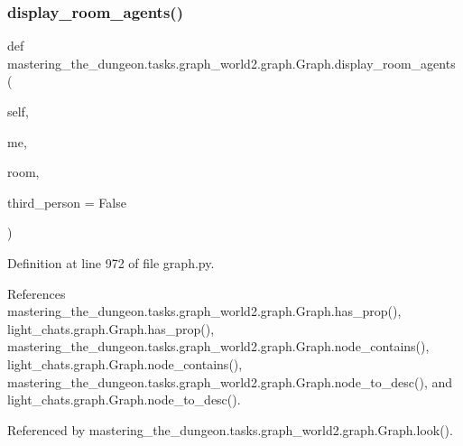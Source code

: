 \subsubsection{\texorpdfstring{display\+\_\+room\+\_\+agents()}{display\_room\_agents()}}
{\footnotesize\ttfamily def mastering\+\_\+the\+\_\+dungeon.\+tasks.\+graph\+\_\+world2.\+graph.\+Graph.\+display\+\_\+room\+\_\+agents (\begin{DoxyParamCaption}\item[{}]{self,  }\item[{}]{me,  }\item[{}]{room,  }\item[{}]{third\+\_\+person = {\ttfamily False} }\end{DoxyParamCaption})}



Definition at line 972 of file graph.\+py.



References mastering\+\_\+the\+\_\+dungeon.\+tasks.\+graph\+\_\+world2.\+graph.\+Graph.\+has\+\_\+prop(), light\+\_\+chats.\+graph.\+Graph.\+has\+\_\+prop(), mastering\+\_\+the\+\_\+dungeon.\+tasks.\+graph\+\_\+world2.\+graph.\+Graph.\+node\+\_\+contains(), light\+\_\+chats.\+graph.\+Graph.\+node\+\_\+contains(), mastering\+\_\+the\+\_\+dungeon.\+tasks.\+graph\+\_\+world2.\+graph.\+Graph.\+node\+\_\+to\+\_\+desc(), and light\+\_\+chats.\+graph.\+Graph.\+node\+\_\+to\+\_\+desc().



Referenced by mastering\+\_\+the\+\_\+dungeon.\+tasks.\+graph\+\_\+world2.\+graph.\+Graph.\+look().

